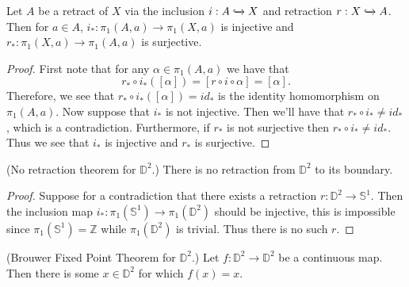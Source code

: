 \documentclass[a4paper,12pt,twoside]{hmcpset}
\begin{document}
\begin{problem}[Theorem 13.32]
    Let $A$ be a retract of $X$ via the inclusion $i : A
    \xhookrightarrow{} X$ and retraction $r: X \xhookrightarrow{} A$.
    Then for $a \in A$, $i_* : \pi_1(A, a) \to \pi_1(X, a)$ is
    injective and $r_*: \pi_1(X, a) \to \pi_1(A, a)$ is surjective. 
\end{problem}

\begin{proof}
    First note that for any
    $\alpha \in \pi_1(A, a)$ we have that 
    \[
        r_* \circ i_*([\alpha]) = [r \circ i \circ \alpha] = [\alpha].
    \]
    Therefore, we see that $ r_* \circ i_*([\alpha]) = id_*$ 
    is the identity homomorphism on $\pi_1(A, a)$. 
    Now suppose that $i_*$ is not injective. Then we'll have that 
    $r_* \circ i_* \ne id_*$, which is a contradiction. Furthermore,
    if $r_*$ is not surjective then $r_* \circ i_* \ne id_*$. Thus we
    see that $i_*$ is injective and $r_*$ is surjective.
\end{proof}

\begin{problem}[Theorem 13.33] 
    (No retraction theorem for $\mathbb{D}^2$.) There is no retraction
    from $\mathbb{D}^2$ to its boundary.
\end{problem}

\begin{proof}
    Suppose for a contradiction that there exists a retraction $r :
    \mathbb{D}^2 \to \mathbb{S}^1$. Then the inclusion map $i_* :
    \pi_1(\mathbb{S}^1) \to \pi_1(\mathbb{D}^2)$ should be injective,
    this is impossible since $\pi_1(\mathbb{S}^1) = \mathbb{Z}$ while
    $\pi_1(\mathbb{D}^2)$ is trivial. Thus there is no such $r$.
\end{proof}

\newpage
\begin{problem}[Theorem 13.34]
    (Brouwer Fixed Point Theorem for $\mathbb{D}^2$.) Let $f:
    \mathbb{D}^2 \to \mathbb{D}^2$ be a continuous map. Then there is
    some $x \in \mathbb{D}^2$ for which $f(x) = x.$
\end{problem}
\end{document}
